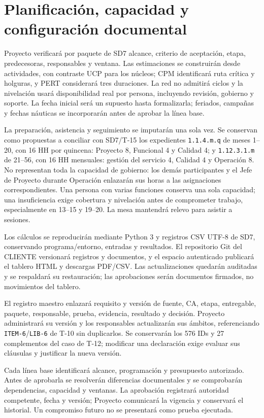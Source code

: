\section{Planificación, capacidad y configuración documental}

Proyecto verificará por paquete de SD7 alcance, criterio de aceptación, etapa, predecesoras, responsables y ventana. Las estimaciones se construirán desde actividades, con contraste UCP para los núcleos; CPM identificará ruta crítica y holguras, y PERT considerará tres duraciones. La red no admitirá ciclos y la nivelación usará disponibilidad real por persona, incluyendo revisión, gobierno y soporte. La fecha inicial será un supuesto hasta formalizarla; feriados, campañas y fechas náuticas se incorporarán antes de aprobar la línea base.

La preparación, asistencia y seguimiento se imputarán una sola vez. Se conservan como propuestas a conciliar con SD7/T-15 los expedientes \texttt{1.1.4.m.q} de meses 1--20, con 16 HH por quincena: Proyecto 8, Funcional 4 y Calidad 4; y \texttt{1.12.3.1.m} de 21--56, con 16 HH mensuales: gestión del servicio 4, Calidad 4 y Operación 8. No representan toda la capacidad de gobierno: los demás participantes y el Jefe de Proyecto durante Operación enlazarán sus horas a las asignaciones correspondientes. Una persona con varias funciones conserva una sola capacidad; una insuficiencia exige cobertura y nivelación antes de comprometer trabajo, especialmente en 13--15 y 19--20. La mesa mantendrá relevo para asistir a sesiones.

Los cálculos se reproducirán mediante Python 3 y registros CSV UTF-8 de SD7, conservando programa/entorno, entradas y resultados. El repositorio Git del CLIENTE versionará registros y documentos, y el espacio autenticado publicará el tablero HTML y descargas PDF/CSV. Las actualizaciones quedarán auditadas y se respaldará su restauración; las aprobaciones serán documentos firmados, no movimientos del tablero.

El registro maestro enlazará requisito y versión de fuente, CA, etapa, entregable, paquete, responsable, prueba, evidencia, resultado y decisión. Proyecto administrará su versión y los responsables actualizarán sus ámbitos, referenciando \texttt{ITEM-6}/\texttt{LIB-6} de T-10 sin duplicarlos. Se conservarán los 576 IDs y 27 complementos del caso de T-12; modificar una declaración exige evaluar sus cláusulas y justificar la nueva versión.

Cada línea base identificará alcance, programación y presupuesto autorizado. Antes de aprobarla se resolverán diferencias documentales y se comprobarán dependencias, capacidad y ventanas. La aprobación registrará autoridad competente, fecha y versión; Proyecto comunicará la vigencia y conservará el historial. Un compromiso futuro no se presentará como prueba ejecutada. \parencites[RT-19.01/03/05/08, pp.~33--34]{sd6-bt}[art.~50.2, p.~29]{sd6-ba}


